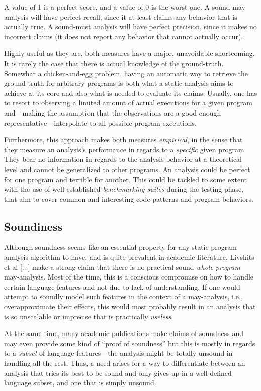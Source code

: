 A value of 1 is a perfect score, and a value of 0 is the worst one. A sound-may
analysis will have perfect recall, since it at least claims any behavior that
is actually true. A sound-must analysis will have perfect precision, since it
makes no incorrect claims (it does not report any behavior that cannot actually
occur).

Highly useful as they are, both measures have a major, unavoidable shortcoming.
It is rarely the case that
there is actual knowledge of the ground-truth. Somewhat a chicken-and-egg
problem, having an automatic way to retrieve the ground-truth for arbitrary
programs is both what a static analysis aims to achieve at its core and also
what is needed to evaluate its claims. Usually, one has to resort to observing
a limited amount of actual executions for a given program and---making the
assumption that the observations are a good enough representative---interpolate
to all possible program executions.

Furthermore, this approach makes both measures \emph{empirical}, in the sense that they measure an
analysis's performance in regards to a \emph{specific} given program. They bear no
information in regards to the analysis behavior at a theoretical level and cannot be
generalized to other programs. An analysis could be perfect for one program and
terrible for another. This could be tackled to some extent with the use of well-established \emph{benchmarking suites} during the testing phase, that aim to cover
common and interesting code patterns and program behaviors.


\subsection{Soundiness}

Although soundness seems like an essential property for any static program
analysis algorithm to have, and is quite prevalent in academic literature,
Livshits et al [...] make a strong claim that there is no practical sound
\emph{whole-program} may-analysis. Most of the time, this is a conscious
compromise on how to handle certain language features and not due to lack of
understanding. If one would attempt to soundly model such features in the
context of a may-analysis, i.e., overapproximate their effects, this would most
probably result in an analysis that is so unscalable or imprecise that is
practically \emph{useless}.

At the same time, many academic publications make claims of soundness and may
even provide some kind of ``proof of soundness'' but this is mostly in regards
to a \emph{subset} of language features---the analysis might be totally unsound
in handling all the rest. Thus, a need arises for a way to differentiate
between an analysis that tries its best to be sound and only gives up in a
well-defined language subset, and one that is simply unsound.


